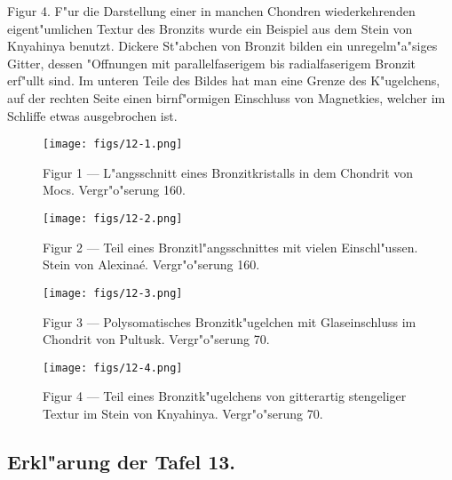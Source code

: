 \documentclass[a4paper, 11pt, oneside, polutonikogreek, german]{article}
\begin{document}
Figur 4. F"ur die Darstellung einer in manchen Chondren wiederkehrenden eigent"umlichen Textur des Bronzits wurde ein Beispiel aus dem Stein von Knyahinya benutzt. Dickere St"abchen von Bronzit bilden ein unregelm"a"siges Gitter, dessen "Offnungen mit parallelfaserigem bis radialfaserigem Bronzit erf"ullt sind. Im unteren Teile des Bildes hat man eine Grenze des K"ugelchens, auf der rechten Seite einen birnf"ormigen Einschluss von Magnetkies, welcher im Schliffe etwas ausgebrochen ist.
\clearpage

\vspace*{\fill}
\begin{figure}[H]
\centering
\texttt{[image: figs/12-1.png]}
\caption{\small Figur 1 --- L"angsschnitt eines Bronzitkristalls in dem Chondrit von Mocs. Vergr"o"serung 160.}
\end{figure}
\vspace*{\fill}
\clearpage

\vspace*{\fill}
\begin{figure}[H]
\centering
\texttt{[image: figs/12-2.png]}
\caption{\small Figur 2 --- Teil eines Bronzitl"angsschnittes mit vielen Einschl"ussen. Stein von Alexinaé. Vergr"o"serung 160.}
\end{figure}
\vspace*{\fill}
\clearpage

\vspace*{\fill}
\begin{figure}[H]
\centering
\texttt{[image: figs/12-3.png]}
\caption{\small Figur 3 --- Polysomatisches Bronzitk"ugelchen mit Glaseinschluss im Chondrit von Pultusk. Vergr"o"serung 70.}
\end{figure}
\vspace*{\fill}
\clearpage

\vspace*{\fill}
\begin{figure}[H]
\centering
\texttt{[image: figs/12-4.png]}
\caption{\small Figur 4 --- Teil eines Bronzitk"ugelchens von gitterartig stengeliger Textur im Stein von Knyahinya. Vergr"o"serung 70.}
\end{figure}
\vspace*{\fill}
\clearpage

\subsection{Erkl"arung der Tafel 13.}
\end{document}

